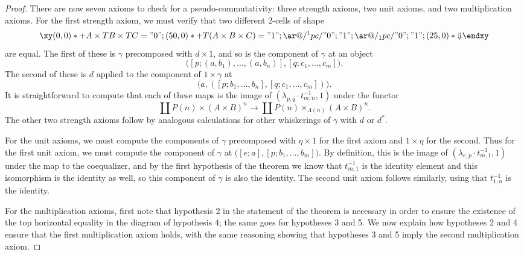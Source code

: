 \documentclass{amsbook} %
\numberwithin{section}{chapter}
\begin{document}
\begin{proof}
There are now seven axioms to check for a pseudo-commutativity:  three strength axioms, two unit axioms, and two multiplication axioms.  For the first strength axiom, we must verify that two different 2-cells of shape
\[
\xy
(0,0)*+{A \times TB \times TC}="0";
(50,0)*+{T(A \times B \times C)}="1";
{\ar@/^1pc/ "0"; "1"};
{\ar@/_1pc/ "0"; "1"};
(25,0)*{\Downarrow}
\endxy
\]
are equal.  The first of these is $\gamma$ precomposed with $d \times 1$, and so is the component of $\gamma$ at an object
\[
\Big( [p;(a,b_1),\ldots,(a,b_n)], [q; c_{1}, \ldots, c_{m}] \Big).
\]
The second of these is $d$ applied to the component of $1 \times \gamma$ at
\[
\Big(a, ([p;b_1,\ldots,b_n], [q; c_{1}, \ldots, c_{m}]) \Big).
\]
It is straightforward to compute that each of these maps is the image of $(\lambda_{p,q}\cdot t_{m,n}^{-1},1)$ under the functor
\[
\coprod P(n) \times (A \times B)^{n} \to \coprod P(n) \times_{\Lambda(n)} (A \times B)^{n}.
\]
The other two strength axioms follow by analogous calculations for other whiskerings of $\gamma$ with $d$ or $d^{*}$.


For the unit axioms, we must compute the components of $\gamma$ precomposed with $\eta \times 1$ for the first axiom and $1 \times \eta$ for the second.  Thus for the first unit axiom, we must compute the component of $\gamma$ at $\big( [e;a], [p; b_{1}, \ldots, b_{m}] \big)$.  By definition, this is the image of $(\lambda_{e,p}\cdot t^{-1}_{m,1}, 1)$ under the map to the coequalizer, and by the first hypothesis of the theorem we know that $t^{-1}_{m,1}$ is the identity element and this isomorphism is the identity as well, so this component of $\gamma$ is also the identity.  The second unit axiom follows similarly, using that $t^{-1}_{1,n}$ is the identity.


For the multiplication axioms, first note that hypothesis 2 in the statement of the theorem is necessary in order to ensure the existence of the top horizontal equality in the diagram of hypothesis 4; the same goes for hypotheses 3 and 5. We now explain how hypotheses 2 and 4 ensure that the first multiplication axiom holds, with the same reasoning showing that hypotheses 3 and 5 imply the second multiplication axiom.


\end{proof}
\end{document}
